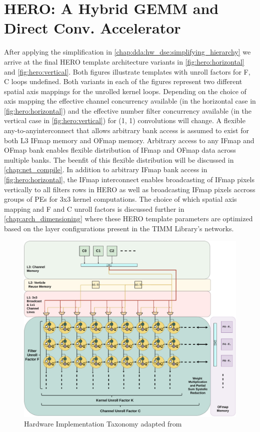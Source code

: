 \section{HERO: A Hybrid GEMM and Direct Conv. Accelerator}
\label{chap:dda:hw_dse:final}

After applying the simplification in
\autoref{chap:dda:hw_dse:simplifying_hierarchy} we arrive at the final HERO
template architecture variants in \autoref{fig:hero:horizontal} and
\autoref{fig:hero:vertical}. Both figures illustrate templates with unroll
factors for F, C loops undefined. Both variants in each of the figures represent
two different spatial axis mappings for the unrolled kernel loops. Depending on
the choice of axis mapping the effective channel concurrency available (in the
horizontal case in \autoref{fig:hero:horizontal}) and the effective number
filter concurrency available (in the vertical case in
\autoref{fig:hero:vertical}) for (1, 1) convolutions will change. A flexible
any-to-anyinterconnect that allows arbitrary bank access is assumed to exist for
both L3 IFmap memory and OFmap memory. Arbitrary access to any IFmap and OFmap
bank enables flexible distribution of IFmap and OFmap data across multiple
banks. The beenfit of this flexible distribution will be discussed in
\autoref{chap:net_compile}. In addition to arbitrary IFmap bank access in
\autoref{fig:hero:horizontal}, the IFmap interconnect enables broadcasting of
IFmap pixels vertically to all filters rows in HERO as well as broadcasting
IFmap pixels accross groups of PEs for 3x3 kernel computations. The choice of
which spatial axis mapping and F and C unroll factors is discussed further in
\autoref{chap:arch_dimensioning} where these HERO template parameters are
optimized based on the layer configurations present in the TIMM Library's
networks.   

\begin{figure}[ht]
    \centering
    \includegraphics[scale=0.58]{fig/hero-t-horizontal.pdf}
    \caption{Hardware Implementation Taxonomy adapted from \cite{maestro}}
    \label{fig:hero:horizontal}
\end{figure}

